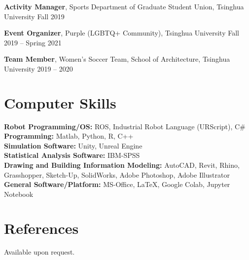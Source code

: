 \documentclass[11pt,a4paper]{article}
\newcommand{\entrytitle}[1]{\textbf{#1}}
\begin{document}
\entrytitle{Activity Manager}, Sports Department of Graduate Student Union, Tsinghua University \hfill Fall 2019

\entrytitle{Event Organizer}, Purple (LGBTQ+ Community), Tsinghua University \hfill Fall 2019 -- Spring 2021

\entrytitle{Team Member}, Women's Soccer Team, School of Architecture, Tsinghua University \hfill 2019 -- 2020

\section{Computer Skills}

\textbf{Robot Programming/OS:} ROS, Industrial Robot Language (URScript), C\# \\
\textbf{Programming:} Matlab, Python, R, C++ \\
\textbf{Simulation Software:} Unity, Unreal Engine \\
\textbf{Statistical Analysis Software:} IBM-SPSS \\
\textbf{Drawing and Building Information Modeling:} AutoCAD, Revit, Rhino, Grasshopper, Sketch-Up, SolidWorks, Adobe Photoshop, Adobe Illustrator \\
\textbf{General Software/Platform:} MS-Office, \LaTeX, Google Colab, Jupyter Notebook

\section{References}

Available upon request.
\end{document}
